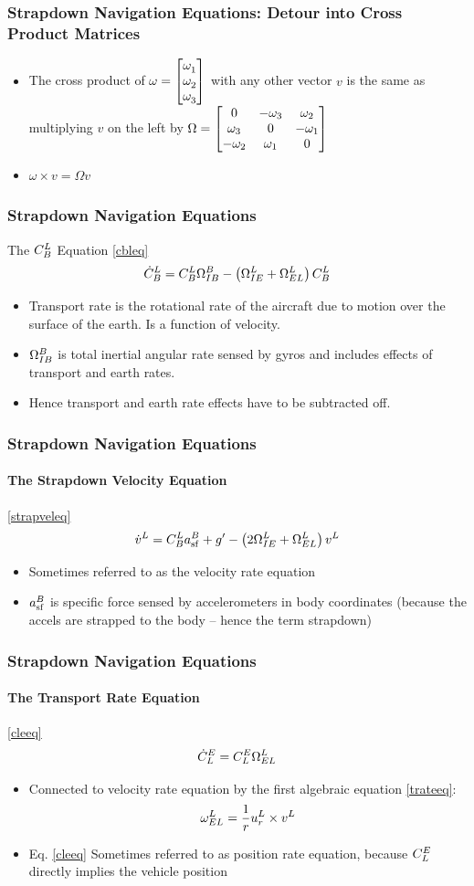 \begin{frame}
\frametitle{Strapdown Navigation Equations: Detour into Cross Product Matrices}
\begin{itemize}
\item The cross product of $\omega=\colvecthree{\omega}{}$ with any other vector $v$ is the same as multiplying $v$ on the left by
$\Omega = \skewsymmat{\omega}{1}{2}{3}$
\item $\omega \times v=\Omega v$
\end{itemize}
\end{frame}

\begin{frame}
\frametitle{Strapdown Navigation Equations}
The $\dcm{B}{L}$ Equation \eqref{cbleq}
\[\cbleq\]
\begin{itemize}
\item Transport rate is the rotational rate of the aircraft due to
motion over the surface of the earth.  Is a function of velocity.
\item $\rotmat{I}{B}^B$ is total inertial angular rate sensed by gyros and includes effects of
transport and earth rates.
\item Hence transport and earth rate effects have to be subtracted
off.
\end{itemize}
\end{frame}

\begin{frame}
\frametitle{Strapdown Navigation Equations}
\framesubtitle{The Strapdown Velocity Equation} \eqref{strapveleq}
\[\strapveleq\]
 \begin{itemize}
 \item Sometimes referred to as the velocity rate equation
 \item $\specforce^B$ is specific force sensed by accelerometers in
 body coordinates (because the accels are strapped to the body --
 hence the term strapdown)
\end{itemize}
\end{frame}


\begin{frame}
\frametitle{Strapdown Navigation Equations}
\framesubtitle{The Transport Rate Equation}
 \eqref{cleeq}
\[\cleeq\]
\begin{itemize}
  \item Connected to velocity rate equation by the first algebraic equation \eqref{trateeq}:
\[\trateeq\]
  \item Eq. \eqref{cleeq} Sometimes referred to as position rate equation, because $\dcm{L}{E}$ directly implies the vehicle position
\end{itemize} 
\end{frame}

